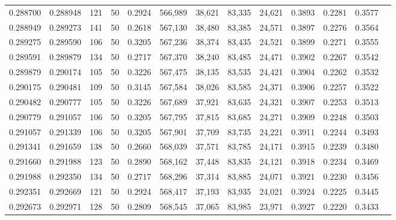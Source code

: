 \begin{tabular}{rrrrrrrrrrrrr}
0.288700 & 0.288948 &   121 &  50 &                                     0.2924 & 566,989 &  38,621 &  83,335 &  24,621 & 0.3893 & 0.2281 & 0.3577 \\
0.288949 & 0.289273 &   141 &  50 &                                     0.2618 & 567,130 &  38,480 &  83,385 &  24,571 & 0.3897 & 0.2276 & 0.3564 \\
0.289275 & 0.289590 &   106 &  50 &                                     0.3205 & 567,236 &  38,374 &  83,435 &  24,521 & 0.3899 & 0.2271 & 0.3555 \\
0.289591 & 0.289879 &   134 &  50 &                                     0.2717 & 567,370 &  38,240 &  83,485 &  24,471 & 0.3902 & 0.2267 & 0.3542 \\
0.289879 & 0.290174 &   105 &  50 &                                     0.3226 & 567,475 &  38,135 &  83,535 &  24,421 & 0.3904 & 0.2262 & 0.3532 \\
0.290175 & 0.290481 &   109 &  50 &                                     0.3145 & 567,584 &  38,026 &  83,585 &  24,371 & 0.3906 & 0.2257 & 0.3522 \\
0.290482 & 0.290777 &   105 &  50 &                                     0.3226 & 567,689 &  37,921 &  83,635 &  24,321 & 0.3907 & 0.2253 & 0.3513 \\
0.290779 & 0.291057 &   106 &  50 &                                     0.3205 & 567,795 &  37,815 &  83,685 &  24,271 & 0.3909 & 0.2248 & 0.3503 \\
0.291057 & 0.291339 &   106 &  50 &                                     0.3205 & 567,901 &  37,709 &  83,735 &  24,221 & 0.3911 & 0.2244 & 0.3493 \\
0.291341 & 0.291659 &   138 &  50 &                                     0.2660 & 568,039 &  37,571 &  83,785 &  24,171 & 0.3915 & 0.2239 & 0.3480 \\
0.291660 & 0.291988 &   123 &  50 &                                     0.2890 & 568,162 &  37,448 &  83,835 &  24,121 & 0.3918 & 0.2234 & 0.3469 \\
0.291988 & 0.292350 &   134 &  50 &                                     0.2717 & 568,296 &  37,314 &  83,885 &  24,071 & 0.3921 & 0.2230 & 0.3456 \\
0.292351 & 0.292669 &   121 &  50 &                                     0.2924 & 568,417 &  37,193 &  83,935 &  24,021 & 0.3924 & 0.2225 & 0.3445 \\
0.292673 & 0.292971 &   128 &  50 &                                     0.2809 & 568,545 &  37,065 &  83,985 &  23,971 & 0.3927 & 0.2220 & 0.3433 \\

\end{tabular}
